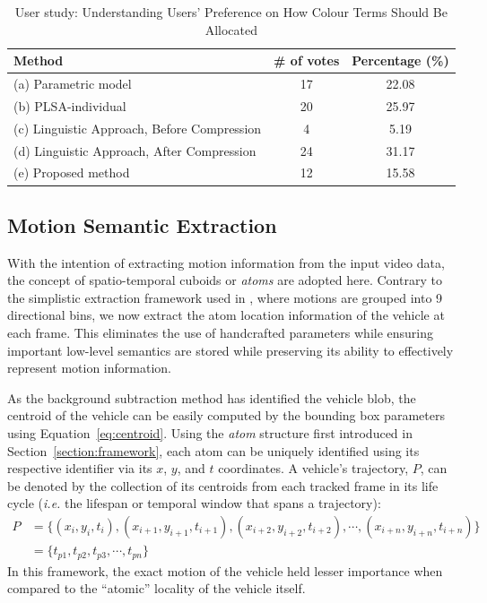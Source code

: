 \begin{table}[H]\centering
\caption{User study: Understanding Users' Preference on How Colour Terms Should Be Allocated}
\begin{tabular}{|l|c|c|}
\hline
\textbf{Method}                             & \textbf{\# of votes} & \textbf{Percentage (\%)} \\ \hline
(a) Parametric model                        & 17                   & 22.08              \\ \hline
(b) PLSA-individual                         & 20                   & 25.97              \\ \hline
(c) Linguistic Approach, Before Compression & 4                    & 5.19              \\ \hline
(d) Linguistic Approach, After Compression  & 24                   & 31.17              \\ \hline
(e) Proposed method                         & 12                   & 15.58              \\ \hline
\end{tabular}
\label{tab:munsell_result}
\end{table}
\vspace{-2em}


\vspace{1em}
\subsection{Motion Semantic Extraction}
\label{subsec:chamferdistancemotionextraction}

With the intention of extracting motion information from the input video data, the concept of spatio-temporal cuboids or \emph{atoms} are adopted here. Contrary to the simplistic extraction framework used in \versionOneExt, where motions are grouped into 9 directional bins, we now extract the atom location information of the vehicle at each frame. This eliminates the use of handcrafted parameters while ensuring important low-level semantics are stored while preserving its ability to effectively represent motion information.

As the background subtraction method has identified the vehicle blob, the centroid of the vehicle can be easily computed by the bounding box parameters using Equation~\ref{eq:centroid}. Using the \emph{atom} structure first introduced in Section~\ref{section:framework}, each atom can be uniquely identified using its respective identifier via its $x$, $y$, and $t$ coordinates. A vehicle's trajectory, $P$, can be denoted by the collection of its centroids from each tracked frame in its life cycle (\emph{i.e.} the lifespan or temporal window that spans a trajectory):
\begin{align}
    P &= \{ (x_i, y_i, t_i), (x_{i+1}, y_{i+1}, t_{i+1}), (x_{i+2}, y_{i+2}, t_{i+2}), \dotsb,(x_{i+n}, y_{i+n}, t_{i+n})\}  \nonumber \\
      &= \{ t_{p1}, t_{p2}, t_{p3}, \dotsb, t_{pn}\}
\end{align}
In this framework, the exact motion of the vehicle held lesser importance when compared to the ``atomic'' locality of the vehicle itself.

